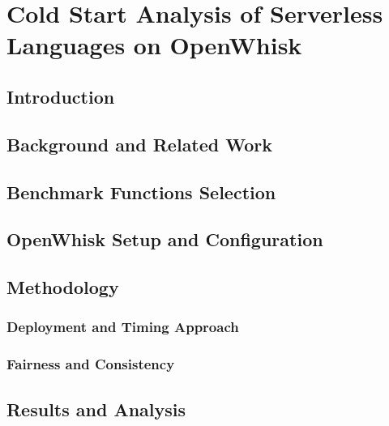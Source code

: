 \chapter{Cold Start Analysis of Serverless Languages on OpenWhisk}
\label{chap:cold_start_analysis}

\section{Introduction}
\label{sec:introduction_cold_start_analysis}

\section{Background and Related Work}
\label{sec:background_and_related_work}

\section{Benchmark Functions Selection}
\label{sec:benchmark_functions_selection}

\section{OpenWhisk Setup and Configuration}
\label{sec:openwhisk_setup_and_configuration}

\section{Methodology}
\label{sec:methodology}

\subsection{Deployment and Timing Approach}
\label{subsec:deployment_and_timing_approach}

\subsection{Fairness and Consistency}
\label{subsec:fairness_and_consistency}

\section{Results and Analysis}
\label{sec:results_and_analysis}

